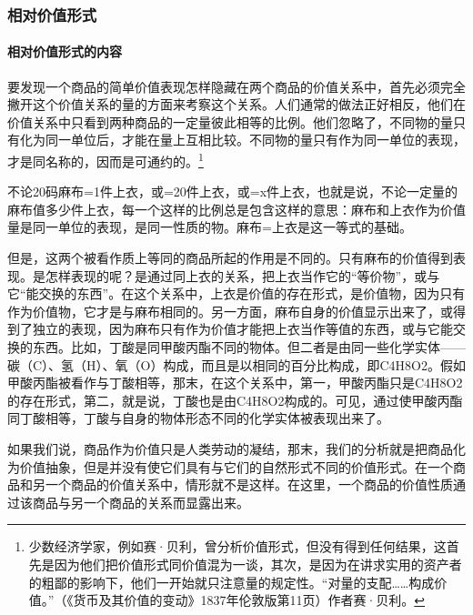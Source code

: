 \documentclass{ctexbook}
\begin{document}
            \subsubsection{相对价值形式}

                \paragraph{相对价值形式的内容}

                要发现一个商品的简单价值表现怎样隐藏在两个商品的价值关系中，首先必须完全撇开这个价值关系的量的方面来考察这个关系。人们通常的做法正好相反，他们在价值关系中只看到两种商品的一定量彼此相等的比例。他们忽略了，不同物的量只有化为同一单位后，才能在量上互相比较。不同物的量只有作为同一单位的表现，才是同名称的，因而是可通约的。\footnote{少数经济学家，例如赛·贝利，曾分析价值形式，但没有得到任何结果，这首先是因为他们把价值形式同价值混为一谈，其次，是因为在讲求实用的资产者的粗鄙的影响下，他们一开始就只注意量的规定性。“对量的支配……构成价值。”（《货币及其价值的变动》1837年伦敦版第11页）作者赛·贝利。}
                
                不论20码麻布=1件上衣，或=20件上衣，或=x件上衣，也就是说，不论一定量的麻布值多少件上衣，每一个这样的比例总是包含这样的意思：麻布和上衣作为价值量是同一单位的表现，是同一性质的物。麻布=上衣是这一等式的基础。
                
                但是，这两个被看作质上等同的商品所起的作用是不同的。只有麻布的价值得到表现。是怎样表现的呢？是通过同上衣的关系，把上衣当作它的“等价物”，或与它“能交换的东西”。在这个关系中，上衣是价值的存在形式，是价值物，因为只有作为价值物，它才是与麻布相同的。另一方面，麻布自身的价值显示出来了，或得到了独立的表现，因为麻布只有作为价值才能把上衣当作等值的东西，或与它能交换的东西。比如，丁酸是同甲酸丙酯不同的物体。但二者是由同一些化学实体——碳（C）、氢（H）、氧（O）构成，而且是以相同的百分比构成，即C4H8O2。假如甲酸丙酯被看作与丁酸相等，那末，在这个关系中，第一，甲酸丙酯只是C4H8O2的存在形式，第二，就是说，丁酸也是由C4H8O2构成的。可见，通过使甲酸丙酯同丁酸相等，丁酸与自身的物体形态不同的化学实体被表现出来了。
                
                如果我们说，商品作为价值只是人类劳动的凝结，那末，我们的分析就是把商品化为价值抽象，但是并没有使它们具有与它们的自然形式不同的价值形式。在一个商品和另一个商品的价值关系中，情形就不是这样。在这里，一个商品的价值性质通过该商品与另一个商品的关系而显露出来。
                
\end{document}
